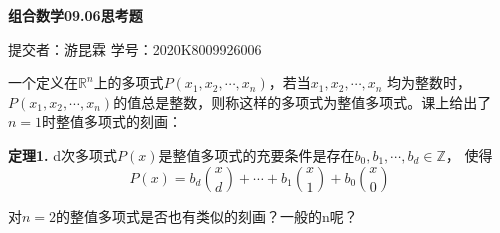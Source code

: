 \documentclass[fontset=windows,11pt]{article}
\newtheorem{question}{\hskip 1.7em}
\begin{document}
    \begin{center}
        {\Large \bf 组合数学09.06思考题}\\
    \end{center}
    \begin{kaishu}
        \hfill 提交者：游昆霖 \quad 学号：2020K8009926006
    \end{kaishu}
    \begin{question}
        一个定义在$\mathbb{R}^n$上的多项式$P(x_1,x_2,\cdots,x_n)$，若当$x_1,x_2,\cdots,x_n$
        均为整数时，$P(x_1,x_2,\cdots,x_n)$的值总是整数，则称这样的多项式为整值多项式。课上给出了
        $n=1$时整值多项式的刻画：\par
        \textbf{定理1.} d次多项式$P(x)$是整值多项式的充要条件是存在$b_0,b_1,\cdots,b_d\in \mathbb{Z}$，
        使得\[ P(x)=b_d\binom{x}{d}+\cdots+b_1\binom{x}{1}+b_0\binom{x}{0} \]\par
        对$n=2$的整值多项式是否也有类似的刻画？一般的n呢？
    \end{question}
\end{document}
